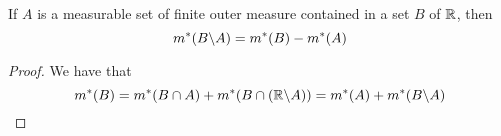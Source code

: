 \begin{lemma}\label{8.3.9}
    If $A$ is a measurable set of finite outer measure contained in a set  $B$
    of  $\mathbb{R}$, then
    \begin{equation*}
        m^\ast(B \backslash A)=m^\ast(B)-m^\ast(A)
    \end{equation*}
\end{lemma}
\begin{proof}
    We have that
    \begin{equation*}
        m^\ast(B)=m^\ast(B \cap A)+m^\ast(B \cap (\mathbb{R} \backslash A))
        =m^\ast(A)+m^\ast(B \backslash A)
    \end{equation*}
\end{proof}
